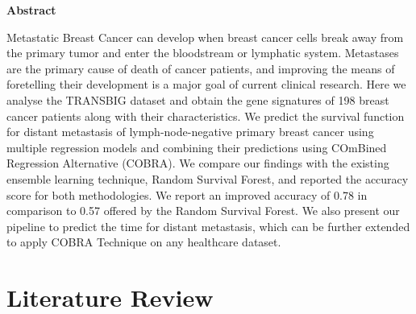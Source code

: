 \documentclass[13pt]{article}
\begin{document}
\normalsize
\begin{center}
\Large
\textbf{Abstract}
\end{center}
Metastatic Breast Cancer can develop when breast cancer cells break away from the primary tumor and enter the bloodstream or lymphatic system. Metastases are the primary cause of death of cancer patients, and improving the means of foretelling their development is a major goal of current clinical research. Here we analyse the TRANSBIG dataset and obtain the gene signatures of 198 breast cancer patients along with their characteristics. We predict the survival function for distant metastasis of lymph-node-negative primary breast cancer using multiple regression models and combining their predictions using COmBined Regression Alternative (COBRA). We compare our findings with the existing ensemble learning technique, Random Survival Forest, and reported the accuracy score for both methodologies. We report an improved accuracy of 0.78 in comparison to 0.57 offered by the Random Survival Forest. We also present our pipeline to predict the time for distant metastasis, which can be further extended to apply COBRA Technique on any healthcare dataset.




\clearpage

\section{Literature Review}
\end{document}
